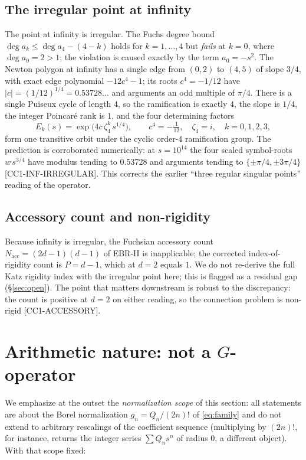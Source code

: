 \documentclass[11pt,reqno]{amsart}
\theoremstyle{plain}
\theoremstyle{definition}
\theoremstyle{remark}
\newcommand{\claim}[1]{\textsf{\small[#1]}}
\begin{document}
\subsection{The irregular point at infinity}\label{sec:inf}
The point at infinity is irregular. The Fuchs degree bound
$\deg a_{k}\le \deg a_{4}-(4-k)$ holds for $k=1,\dots,4$ but \emph{fails} at
$k=0$, where $\deg a_{0}=2>1$; the violation is caused exactly by the term
$a_{0}=-s^{2}$. The Newton polygon at infinity has a single edge from $(0,2)$
to $(4,5)$ of slope $3/4$, with exact edge polynomial $-12c^{4}-1$; its roots
$c^{4}=-1/12$ have $|c|=(1/12)^{1/4}=0.53728\ldots$ and arguments an odd
multiple of $\pi/4$. There is a single Puiseux cycle of length $4$, so the
ramification is exactly $4$, the slope is $1/4$, the integer Poincar\'e rank is
$1$, and the four determining factors
\begin{equation}\label{eq:detfactors}
  E_{k}(s)=\exp\!\big(4c\,\zeta_{4}^{k}\,s^{1/4}\big),\qquad
  c^{4}=-\tfrac{1}{12},\quad \zeta_{4}=i,\quad k=0,1,2,3,
\end{equation}
form one transitive orbit under the cyclic order-$4$ ramification group. The
prediction is corroborated numerically: at $s=10^{14}$ the four scaled
symbol-roots $w\,s^{3/4}$ have modulus tending to $0.53728$ and arguments
tending to $\{\pm\pi/4,\pm3\pi/4\}$ \claim{CC1-INF-IRREGULAR}. This corrects
the earlier ``three regular singular points'' reading of the operator.

\subsection{Accessory count and non-rigidity}
Because infinity is irregular, the Fuchsian accessory count
$N_{\mathrm{acc}}=(2d-1)(d-1)$ of EBR-II is inapplicable; the corrected
index-of-rigidity count is $P=d-1$, which at $d=2$ equals $1$. We do not
re-derive the full Katz rigidity index with the irregular point here; this is
flagged as a residual gap (\S\ref{sec:open}). The point that matters
downstream is robust to the discrepancy: the count is positive at $d=2$ on
either reading, so the connection problem is non-rigid \claim{CC1-ACCESSORY}.

\section{Arithmetic nature: not a $G$-operator}\label{sec:gfun}

We emphasize at the outset the \emph{normalization scope} of this section: all
statements are about the Borel normalization $g_{n}=Q_{n}/(2n)!$ of
\eqref{eq:family} and do not extend to arbitrary rescalings of the coefficient
sequence (multiplying by $(2n)!$, for instance, returns the integer series
$\sum Q_{n}s^{n}$ of radius $0$, a different object). With that scope fixed:
\end{document}
